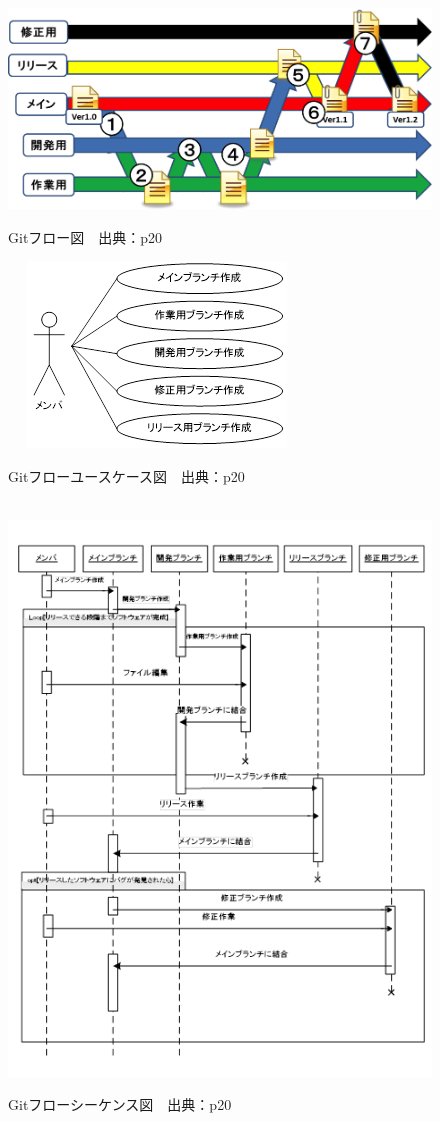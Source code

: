 \begin{figure}[H]
\centering　
\includegraphics[width=13cm]{git.png}
\caption{Gitフロー図　出典：\cite{onodera2015}p20}\label{tab:gitフロー}
\end{figure}
\begin{figure}[H]
\centering　
\includegraphics{gityou.png}
\caption{Gitフローユースケース図　出典：\cite{onodera2015}p20}\label{tab:gityou}
\end{figure}
\begin{figure}[H]
\centering　
\includegraphics{gitsi.png}
\caption{Gitフローシーケンス図　出典：\cite{onodera2015}p20}\label{tab:gitsi}
\end{figure}


